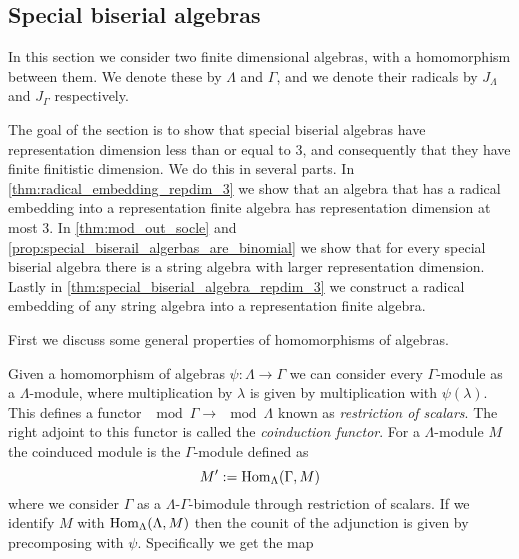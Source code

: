 \subsection{Special biserial algebras}\label{sec:special_biserial_algebras}

In this section we consider two finite dimensional algebras, with a homomorphism between them. We denote these by $\Lambda$ and $\Gamma$, and we denote their radicals by $J_\Lambda$ and $J_\Gamma$ respectively.

The goal of the section is to show that special biserial algebras have representation dimension less than or equal to 3, and consequently that they have finite finitistic dimension. We do this in several parts. In \cref{thm:radical_embedding_repdim_3} we show that an algebra that has a radical embedding into a representation finite algebra has representation dimension at most 3. In \cref{thm:mod_out_socle} and \cref{prop:special_biserail_algerbas_are_binomial} we show that for every special biserial algebra there is a string algebra with larger representation dimension. Lastly in \cref{thm:special_biserial_algebra_repdim_3} we construct a radical embedding of any string algebra into a representation finite algebra.

First we discuss some general properties of homomorphisms of algebras.

\begin{defn}
	Given a homomorphism of algebras $\psi\colon\Lambda \to \Gamma$ we can consider every $\Gamma$-module as a $\Lambda$-module, where multiplication by $\lambda$ is given by multiplication with $\psi(\lambda)$. This defines a functor $\mod\Gamma \to \mod\Lambda$ known as \emph{restriction of scalars}. The right adjoint to this functor is called the \emph{coinduction functor}. For a $\Lambda$-module $M$ the coinduced module is the $\Gamma$-module defined as
	$$M' := \operatorname{Hom}_\Lambda(\Gamma, M)$$
	where we consider $\Gamma$ as a $\Lambda$-$\Gamma$-bimodule through restriction of scalars. If we identify $M$ with $\operatorname{Hom}_\Lambda(\Lambda, M)$ then the counit of the adjunction is given by precomposing with $\psi$. Specifically we get the map
	\begin{center}
	\end{center}
\end{defn}

